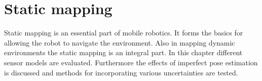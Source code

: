\chapter{Static mapping}
Static mapping is an essential part of mobile robotics. It forms the basics for allowing the robot to navigate the environment. 
Also in mapping dynamic environments the static mapping is an integral part. 
In this chapter different sensor models are evaluated. Furthermore the effects of imperfect pose estimation is discussed and methods for incorporating various uncertainties are tested. 





